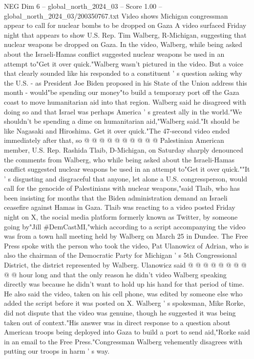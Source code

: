 \begin{textsample}{NEG Dim 6 – global\_north\_2024\_03 – Score 1.00 – global\_north\_2024\_03/200350767.txt}  \label{ex:f6_neg_405}
Video shows Michigan congressman appear to call for nuclear bombs to be dropped on Gaza A video surfaced Friday night that appears to show U.S.
Rep.
Tim Walberg, R-Michigan, suggesting that nuclear weapons be dropped on Gaza.
In the video, Walberg, while being asked about the Israeli-Hamas conflict suggested nuclear weapons be used in an attempt to"Get it over quick."Walberg wasn't pictured in the video.
But a voice that clearly sounded like his responded to a constituent ' s question asking why the U.S. - as President Joe Biden proposed in his State of the Union address this month - would"be spending our money"to build a temporary port off the Gaza coast to move humanitarian aid into that region.
Walberg said he disagreed with doing so and that Israel was perhaps America ' s greatest ally in the world."We shouldn't be spending a dime on humanitarian aid,"Walberg said."It should be like Nagasaki and Hiroshima.
Get it over quick."The 47-second video ended immediately after that, so @ @ @ @ @ @ @ @ @ @ Palestinian American member, U.S.
Rep.
Rashida Tlaib, D-Michigan, on Saturday sharply denounced the comments from Walberg, who while being asked about the Israeli-Hamas conflict suggested nuclear weapons be used in an attempt to"Get it over quick.""It ' s disgusting and disgraceful that anyone, let alone a U.S. congressperson, would call for the genocide of Palestinians with nuclear weapons,"said Tlaib, who has been insisting for months that the Biden administration demand an Israeli ceasefire against Hamas in Gaza.
Tlaib was reacting to a video posted Friday night on X, the social media platform formerly known as Twitter, by someone going by"Jill \#DemCastMI,"which according to a script accompanying the video was from a town hall meeting held by Walberg on March 25 in Dundee.
The Free Press spoke with the person who took the video, Pat Ulanowicz of Adrian, who is also the chairman of the Democratic Party for Michigan ' s 5th Congressional District, the district represented by Walberg.
Ulanowicz said @ @ @ @ @ @ @ @ @ @ hour long and that the only reason he didn't video Walberg speaking directly was because he didn't want to hold up his hand for that period of time.
He also said the video, taken on his cell phone, was edited by someone else who added the script before it was posted on X.
Walberg ' s spokesman, Mike Rorke, did not dispute that the video was genuine, though he suggested it was being taken out of context."His answer was in direct response to a question about American troops being deployed into Gaza to build a port to send aid,"Rorke said in an email to the Free Press."Congressman Walberg vehemently disagrees with putting our troops in harm ' s way.

\end{textsample}
